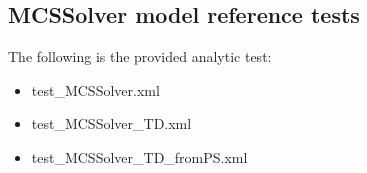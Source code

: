 \subsection{MCSSolver model reference tests}
The following is the provided analytic test:
\begin{itemize}
  \item test\_MCSSolver.xml
  \item test\_MCSSolver\_TD.xml
  \item test\_MCSSolver\_TD\_fromPS.xml
\end{itemize}




